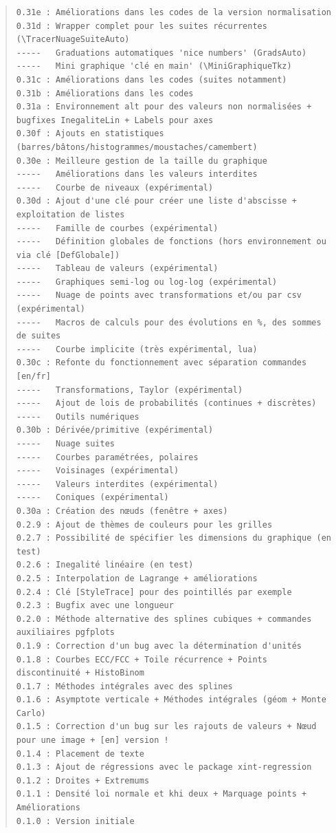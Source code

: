 \documentclass[11pt,a4paper]{ltxdoc}
\begin{document}
{\footnotesize \begin{quote}
\begin{verbatim}
0.31e : Améliorations dans les codes de la version normalisation
0.31d : Wrapper complet pour les suites récurrentes (\TracerNuageSuiteAuto)
-----   Graduations automatiques 'nice numbers' (GradsAuto)
-----   Mini graphique 'clé en main' (\MiniGraphiqueTkz)
0.31c : Améliorations dans les codes (suites notamment)
0.31b : Améliorations dans les codes
0.31a : Environnement alt pour des valeurs non normalisées + bugfixes InegaliteLin + Labels pour axes
0.30f : Ajouts en statistiques (barres/bâtons/histogrammes/moustaches/camembert)
0.30e : Meilleure gestion de la taille du graphique
-----   Améliorations dans les valeurs interdites
-----   Courbe de niveaux (expérimental)
0.30d : Ajout d'une clé pour créer une liste d'abscisse + exploitation de listes
-----   Famille de courbes (expérimental)
-----   Définition globales de fonctions (hors environnement ou via clé [DefGlobale])
-----   Tableau de valeurs (expérimental)
-----   Graphiques semi-log ou log-log (expérimental)
-----   Nuage de points avec transformations et/ou par csv (expérimental)
-----   Macros de calculs pour des évolutions en %, des sommes de suites
-----   Courbe implicite (très expérimental, lua)
0.30c : Refonte du fonctionnement avec séparation commandes [en/fr]
-----   Transformations, Taylor (expérimental)
-----   Ajout de lois de probabilités (continues + discrètes)
-----   Outils numériques
0.30b : Dérivée/primitive (expérimental)
-----   Nuage suites
-----   Courbes paramétrées, polaires
-----   Voisinages (expérimental)
-----   Valeurs interdites (expérimental)
-----   Coniques (expérimental)
0.30a : Création des nœuds (fenêtre + axes)
0.2.9 : Ajout de thèmes de couleurs pour les grilles
0.2.7 : Possibilité de spécifier les dimensions du graphique (en test)
0.2.6 : Inegalité linéaire (en test)
0.2.5 : Interpolation de Lagrange + améliorations
0.2.4 : Clé [StyleTrace] pour des pointillés par exemple
0.2.3 : Bugfix avec une longueur
0.2.0 : Méthode alternative des splines cubiques + commandes auxiliaires pgfplots
0.1.9 : Correction d'un bug avec la détermination d'unités
0.1.8 : Courbes ECC/FCC + Toile récurrence + Points discontinuité + HistoBinom
0.1.7 : Méthodes intégrales avec des splines
0.1.6 : Asymptote verticale + Méthodes intégrales (géom + Monte Carlo)
0.1.5 : Correction d'un bug sur les rajouts de valeurs + Nœud pour une image + [en] version !
0.1.4 : Placement de texte
0.1.3 : Ajout de régressions avec le package xint-regression
0.1.2 : Droites + Extremums
0.1.1 : Densité loi normale et khi deux + Marquage points + Améliorations
0.1.0 : Version initiale
\end{verbatim}
\end{quote}}
\end{document}
